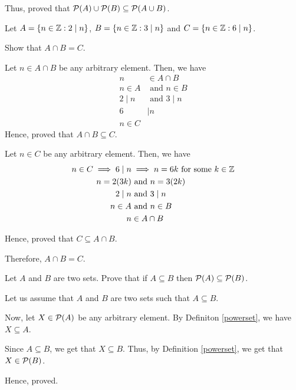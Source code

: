 Thus, proved that $\mathcal{P}(A) \cup \mathcal{P}(B) \subseteq \mathcal{P}(A \cup B)$.
\es


\bp
Let $A = \{n \in \mathbb{Z} : 2 \mid n\}$, $B = \{ n \in \mathbb{Z} : 3 \mid n \}$ and $C = \{ n \in \mathbb{Z} : 6 \mid n \}$.

Show that $A \cap B = C$.
\ep

\bs
Let $n \in A \cap B$ be any arbitrary element. Then, we have
\begin{align}
	n        & \in A \cap B          \\
	n \in A  & \text{ and } n \in B  \\
	2 \mid n & \text{ and } 3 \mid n \\
	6        & \mid n                \\
	n \in C
\end{align}
Hence, proved that $A \cap B \subseteq C$.

Let $n \in C$ be any arbitrary element. Then, we have
\begin{align}
	n \in C \implies 6 \mid n & \implies n = 6k \text{ for some } k \in \mathbb{Z} \\
	n = 2(3k)                 & \text{ and } n = 3(2k)                         \\
	2 \mid n                  & \text{ and } 3 \mid n                          \\
	n \in A                   & \text{ and } n \in B                           \\
	n                         & \in A \cap B
\end{align}

Hence, proved that $C \subseteq A \cap B$.

Therefore, $A \cap B = C$.
\es

\bp
Let $A$ and $B$ are two sets. Prove that if $A \subseteq B$ then $\mathcal{P}(A) \subseteq \mathcal{P}(B)$.
\ep

\bs
Let us assume that $A$ and $B$ are two sets such that $A \subseteq B$.

Now, let $X \in \mathcal{P}(A)$ be any arbitrary element.
By Definiton \ref{powerset}, we have $X \subseteq A$.

Since $A \subseteq B$, we get that $X \subseteq B$. Thus, by Definition \ref{powerset}, we get that $X \in \mathcal{P}(B)$.

Hence, proved.
\es

